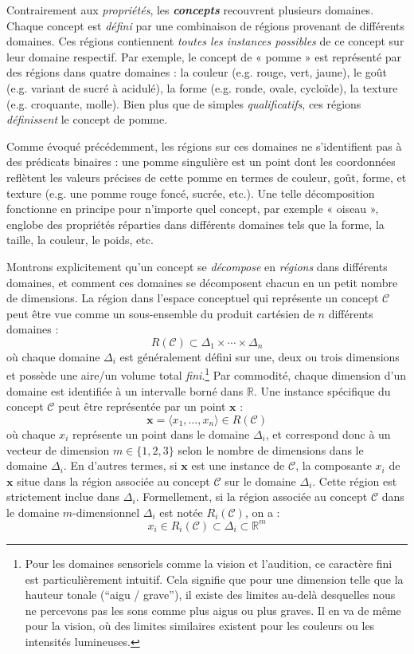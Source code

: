 \documentclass{article}
\newcommand{\bolditalic}[1]{\textbf{\textit{#1}}}
\begin{document}
Contrairement aux \textit{propriétés}, les \bolditalic{concepts} recouvrent plusieurs domaines. Chaque concept est \textit{défini} par une combinaison de régions provenant de différents domaines. Ces régions contiennent \textit{toutes les instances possibles} de ce concept sur leur domaine respectif. Par exemple, le concept de « pomme » est représenté par des régions dans quatre domaines : la couleur (e.g. rouge, vert, jaune), le goût (e.g. variant de sucré à acidulé), la forme (e.g. ronde, ovale, cycloïde), la texture (e.g. croquante, molle). Bien plus que de simples \textit{qualificatifs}, ces régions \textit{définissent} le concept de pomme.
\par
Comme évoqué précédemment, les régions sur ces domaines ne s’identifient pas à des prédicats binaires : une pomme singulière est un point dont les coordonnées reflètent les valeurs précises de cette pomme en termes de couleur, goût, forme, et texture (e.g. une pomme rouge foncé, sucrée, etc.). Une telle décomposition fonctionne en principe pour n’importe quel concept, par exemple « oiseau », englobe des propriétés réparties dans différents domaines tels que la forme, la taille, la couleur, le poids, etc.

Montrons explicitement qu’un concept se \textit{décompose} en \textit{régions} dans différents domaines, et comment ces domaines se décomposent chacun en un petit nombre de dimensions.
La région dans l’espace conceptuel qui représente un concept $\mathcal{C}$ peut être vue comme un sous-ensemble du produit cartésien de $n$ différents domaines :
\[ R(\mathcal{C}) \subset \Delta_1 \times \cdots \times \Delta_n \]
où chaque domaine $\Delta_i$ est généralement défini sur une, deux ou trois dimensions et possède une aire/un volume total \textit{fini}.\footnote{Pour les domaines sensoriels comme la vision et l’audition, ce caractère fini est particulièrement intuitif. Cela signifie que pour une dimension telle que la hauteur tonale (“aigu / grave”), il existe des limites au-delà desquelles nous ne percevons pas les sons comme plus aigus ou plus graves. Il en va de même pour la vision, où des limites similaires existent pour les couleurs ou les intensités lumineuses.}  Par commodité, chaque dimension d’un domaine est identifiée à un intervalle borné dans $\mathbb{R}$. Une instance spécifique du concept $\mathcal{C}$ peut être représentée par un point $\mathbf{x}$ :
\[ \mathbf{x} = \langle x_1, \ldots, x_n \rangle \in R(\mathcal{C}) \]
où chaque $x_i$ représente un point dans le domaine $\Delta_i$, et correspond donc à un vecteur de dimension $m \in \{1, 2, 3\}$ selon le nombre de dimensions dans le domaine $\Delta_i$. En d’autres termes, si $\mathbf{x}$ est une instance de $\mathcal{C}$, la composante $x_i$ de $\mathbf{x}$ situe dans la région associée au concept $\mathcal{C}$ sur le domaine $\Delta_i$. Cette région est strictement inclue dans $\Delta_i$. Formellement, si la région associée au concept $\mathcal{C}$ dans le domaine $m$-dimensionnel $\Delta_i$ est notée $R_i(\mathcal{C})$, on a :
\[ x_i \in R_i(\mathcal{C}) \subset \Delta_i \subset \mathbb{R}^m \]
\end{document}
